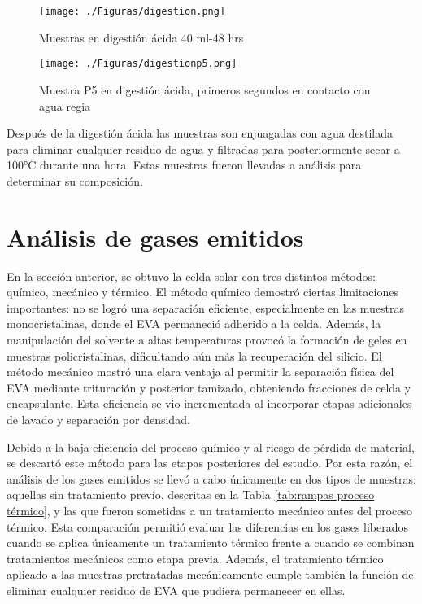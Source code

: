 \begin{figure}[htb]
	\begin{center}
		\texttt{[image: ./Figuras/digestion.png]}
	\end{center}
	\vspace{-1em} %
	\caption{Muestras en digestión ácida 40 ml-48 hrs}
	\label{fig:digestion}
\end{figure}

\begin{figure}[htb]
	\begin{center}
		\texttt{[image: ./Figuras/digestionp5.png]}
	\end{center}
	\vspace{-1em} %
	\caption{Muestra P5 en digestión ácida, primeros segundos en contacto con agua regia}
	\label{fig:digestionp5}
\end{figure}

Después de la digestión ácida las muestras son enjuagadas con agua destilada para eliminar cualquier residuo de agua y filtradas para posteriormente secar a 100°C durante una hora. Estas muestras fueron llevadas a análisis para determinar su composición. 

\clearpage

\section{Análisis de gases emitidos}    
\label{subsec:analisisdegases}

En la sección anterior, se obtuvo la celda solar con tres distintos métodos: químico, mecánico y térmico. El método químico demostró ciertas limitaciones importantes: no se logró una separación eficiente, especialmente en las muestras monocristalinas, donde el EVA permaneció adherido a la celda. Además, la manipulación del solvente a altas temperaturas provocó la formación de geles en muestras policristalinas, dificultando aún más la recuperación del silicio. El método mecánico mostró una clara ventaja al permitir la separación física del EVA mediante trituración y posterior tamizado, obteniendo fracciones de celda y encapsulante. Esta eficiencia se vio incrementada al incorporar etapas adicionales de lavado y separación por densidad. 

Debido a la baja eficiencia del proceso químico y al riesgo de pérdida de material, se descartó este método para las etapas posteriores del estudio. Por esta razón, el análisis de los gases emitidos se llevó a cabo únicamente en dos tipos de muestras: aquellas sin tratamiento previo, descritas en la Tabla \ref{tab:rampas proceso térmico}, y las que fueron sometidas a un tratamiento mecánico antes del proceso térmico. Esta comparación permitió evaluar las diferencias en los gases liberados cuando se aplica únicamente un tratamiento térmico frente a cuando se combinan tratamientos mecánicos como etapa previa. Además, el tratamiento térmico aplicado a las muestras pretratadas mecánicamente cumple también la función de eliminar cualquier residuo de EVA que pudiera permanecer en ellas. 

